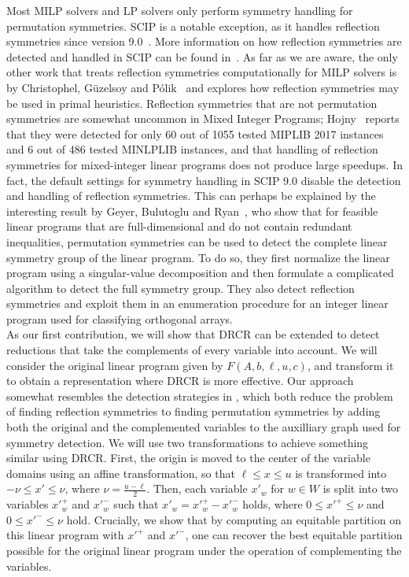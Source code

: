 \documentclass[pdflatex,sn-mathphys-num]{sn-jnl}%
\theoremstyle{thmstyleone}%
\theoremstyle{thmstylethree}%
\theoremstyle{thmstyletwo}%
\begin{document}
Most MILP solvers and LP solvers only perform symmetry handling for permutation symmetries. SCIP is a notable exception, as it handles reflection symmetries since version 9.0~\cite{Bolusani2024}. More information on how reflection symmetries are detected and handled in SCIP can be found in~\cite{Hojny2025-si}. As far as we are aware, the only other work that treats reflection symmetries computationally for MILP solvers is by Christophel, G{\"u}zelsoy and P{\'o}lik~\cite{Christophel2014} and explores how reflection symmetries may be used in primal heuristics. Reflection symmetries that are not permutation symmetries are somewhat uncommon in Mixed Integer Programs; Hojny~\cite{Hojny2025-si} reports that they were detected for only 60 out of 1055 tested MIPLIB 2017 instances and 6 out of 486 tested MINLPLIB instances, and that handling of reflection symmetries for mixed-integer linear programs does not produce large speedups. In fact, the default settings for symmetry handling in SCIP 9.0 disable the detection and handling of reflection symmetries. This can perhaps be explained by the interesting result by Geyer, Bulutoglu and Ryan~\cite{Geyer2019}, who show that for feasible linear programs that are full-dimensional and do not contain redundant inequalities, permutation symmetries can be used to detect the complete linear symmetry group of the linear program. To do so, they first normalize the linear program using a singular-value decomposition and then formulate a complicated algorithm to detect the full symmetry group. They also detect reflection symmetries and exploit them in an enumeration procedure for an integer linear program used for classifying orthogonal arrays.\\

As our first contribution, we will show that DRCR can be extended to detect reductions that take the complements of every variable into account. We will consider the original linear program given by $F(A,b,\ell,u,c)$, and transform it to obtain a representation where DRCR is more effective. 
Our approach somewhat resembles the detection strategies in \cite{Christophel2014,Hojny2025-si}, which both reduce the problem of finding reflection symmetries to finding permutation symmetries by adding both the original and the complemented variables to the auxilliary graph used for symmetry detection. We will use two transformations to achieve something similar using DRCR.
First, the origin is moved to the center of the variable domains using an  affine transformation, so that $\ell \leq x\leq u$ is transformed into $-\nu\leq x' \leq \nu $, where $\nu = \frac{u-\ell}{2}$. Then, each variable $x'_w$ for $w\in W$ is split into two variables $x'^+_w$ and $x'^-_w$ such that $x'_w = x'^+_w - x'^-_w$ holds, where $0\leq x'^+ \leq \nu$ and $0\leq x'^-\leq \nu$ hold. Crucially, we show that by computing an equitable partition on this linear program with $x'^+$ and $x'^-$, one can recover the best equitable partition possible for the original linear program under the operation of complementing the variables.
\end{document}
